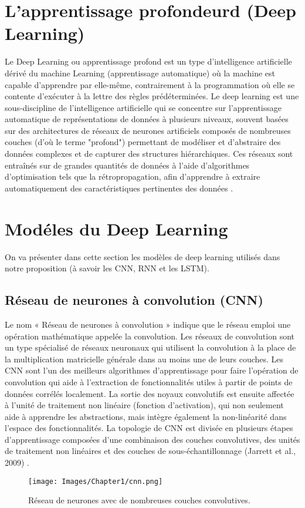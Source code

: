 \begin{itemize}
\begin{itemize}
   \section{L'apprentissage profondeurd (Deep Learning)}
   Le Deep Learning ou apprentissage profond est un type d'intelligence artificielle dérivé du machine Learning (apprentissage automatique) où la machine est capable d'apprendre par elle-même, contrairement à la programmation où elle se contente d'exécuter à la lettre des règles prédéterminées.
   Le deep learning est une sous-discipline de l'intelligence artificielle qui se concentre sur l'apprentissage automatique de représentations de données à plusieurs niveaux, souvent basées sur des architectures de réseaux de neurones artificiels composés de nombreuses couches (d'où le terme "profond") permettant de modéliser et d'abstraire des données complexes et de capturer des structures hiérarchiques. Ces réseaux sont entraînés sur de grandes quantités de données à l'aide d'algorithmes d'optimisation tels que la rétropropagation, afin d'apprendre à extraire automatiquement des caractéristiques pertinentes des données \cite{8}.
   \section{Modéles du Deep Learning}
   On va présenter dans cette section les modèles de deep learning utilisés dans notre proposition (à savoir les CNN, RNN et les LSTM).
   \subsection{Réseau de neurones à convolution (CNN)}
   Le nom « Réseau de neurones à convolution » indique que le réseau emploi une opération mathématique appelée la convolution.
 Les réseaux de convolution sont un type spécialisé de réseaux neuronaux qui utilisent la convolution à la place de la multiplication matricielle générale dans au moins une de leurs couches.
Les CNN sont l’un des meilleurs algorithmes d’apprentissage pour faire l’opération de convolution qui aide à l’extraction de fonctionnalités utiles à partir de points de données corrélés localement. La sortie des noyaux convolutifs est ensuite affectée à l’unité de traitement non linéaire (fonction d’activation), qui non seulement aide à apprendre les abstractions, mais intègre également la non-linéarité dans l’espace des fonctionnalités.
La topologie de CNN est divisée en plusieurs étapes d’apprentissage composées d’une combinaison des couches convolutives, des unités de traitement non linéaires et des couches de sous-échantillonnage (Jarrett et al., 2009) \cite{9}.
\begin{figure}[h]
    \centering
    \texttt{[image: Images/Chapter1/cnn.png]}
    \caption{Réseau de neurones avec de nombreuses couches convolutives.}
    \label{fig:06}
    \end{figure}

\end{itemize}
\end{itemize}
